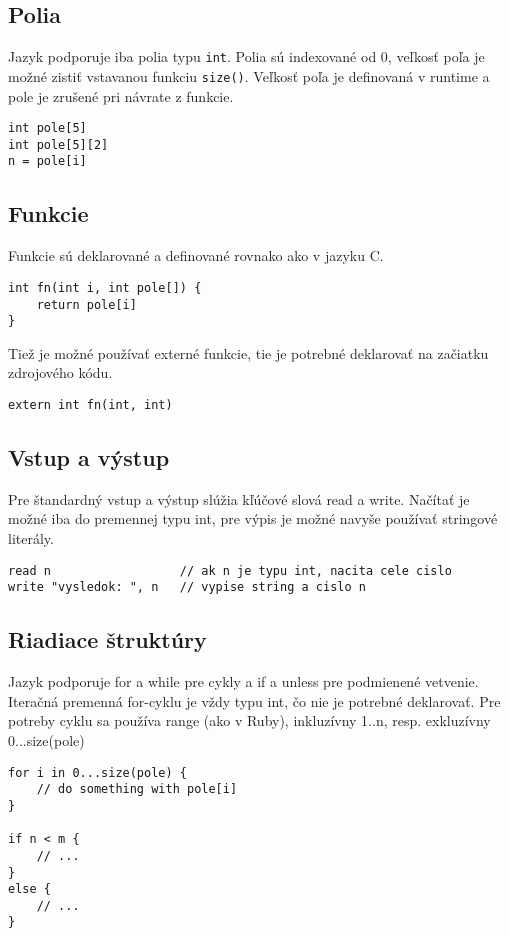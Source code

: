 \documentclass{article}
\begin{document}
    \subsection{Polia}
        Jazyk podporuje iba polia typu \texttt{int}.
        Polia sú indexované od 0, veľkosť poľa je možné zistiť vstavanou funkciu \texttt{size()}.
        Veľkosť poľa je definovaná v runtime a pole je zrušené pri návrate z funkcie.
        \begin{lstlisting}
int pole[5]
int pole[5][2]
n = pole[i]
        \end{lstlisting}

    \subsection{Funkcie}
        Funkcie sú deklarované a definované rovnako ako v jazyku C.
        \begin{lstlisting}
int fn(int i, int pole[]) {
    return pole[i]
}
        \end{lstlisting}
        Tiež je možné používať externé funkcie, tie je potrebné deklarovať na začiatku zdrojového kódu.
        \begin{lstlisting}
extern int fn(int, int)
        \end{lstlisting}

    \subsection{Vstup a výstup}
        Pre štandardný vstup a výstup slúžia kľúčové slová read a write.
        Načítať je možné iba do premennej typu int, pre výpis je možné navyše používať stringové literály.
        \begin{lstlisting}
read n                  // ak n je typu int, nacita cele cislo
write "vysledok: ", n   // vypise string a cislo n
        \end{lstlisting}

    \subsection{Riadiace štruktúry}
        Jazyk podporuje for a while pre cykly a if a unless pre podmienené vetvenie.
        Iteračná premenná for-cyklu je vždy typu int, čo nie je potrebné deklarovať.
        Pre potreby cyklu sa používa range (ako v Ruby), inkluzívny 1..n, resp. exkluzívny 0...size(pole)

        \begin{lstlisting}
for i in 0...size(pole) {
    // do something with pole[i]
}

if n < m {
    // ...
}
else {
    // ...
}
        \end{lstlisting}
        
\end{document}
